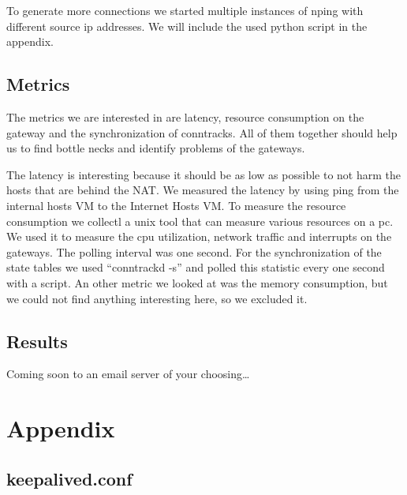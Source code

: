 \documentclass{report}
\begin{document}
To generate more connections we started multiple instances of nping with
different source ip addresses. We will include the used python script in
the appendix.



\section{Metrics}\label{metrics}

The metrics we are interested in are latency, resource consumption on
the gateway and the synchronization of conntracks. All of them together
should help us to find bottle necks and identify problems of the
gateways.

The latency is interesting because it should be as low as possible to
not harm the hosts that are behind the NAT. We measured the latency by
using ping\cite{ping} from the internal hosts VM to the Internet Hosts VM.
To measure the resource consumption we collectl\cite{collectl} a unix tool that
can measure various resources on a pc. We used it to measure the cpu
utilization, network traffic and interrupts on the gateways. The polling
interval was one second. For the synchronization of the state tables we
used ``conntrackd -s'' and polled this statistic every one second with a
script. An other metric we looked at was the memory consumption, but we
could not find anything interesting here, so we excluded it.

\section{Results}\label{results}

Coming soon to an email server of your choosing\ldots{}

\chapter{Appendix}\label{appendix}

\section{keepalived.conf}\label{keepalived-1}
\end{document}
